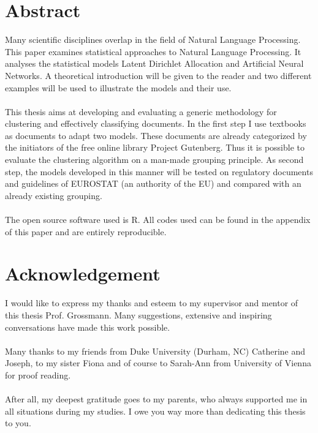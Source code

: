 \documentclass[11pt,a4paper]{article}
\author{Sebastian Knigge}
\begin{document}
\pagestyle{empty}	
	
	
\section*{Abstract}
Many scientific disciplines overlap in the field of Natural Language Processing. This paper examines statistical approaches to Natural Language Processing. It analyses the statistical models Latent Dirichlet Allocation and Artificial Neural Networks. A theoretical introduction will be given to the reader and two different examples will be used to illustrate the models and their use.\\
\ \\
This thesis aims at developing and evaluating a generic methodology for clustering and effectively classifying documents. In the first step I use textbooks as documents to adapt two models. These documents are already categorized by the initiators of the free online library Project Gutenberg. Thus it is possible to evaluate the clustering algorithm on a man-made grouping principle. As second step, the models developed in this manner will be tested on regulatory documents and guidelines of EUROSTAT (an authority of the EU) and compared with an already existing grouping.\\
\ \\
The open source software used is R. All codes used can be found in the appendix of this paper and are entirely reproducible.

	

\newpage

	
\section*{Acknowledgement}

I would like to express my thanks and esteem to my supervisor and mentor of this thesis Prof. Grossmann. Many suggestions, extensive and inspiring conversations have made this work possible.\\
\ \\
Many thanks to my friends from Duke University (Durham, NC) Catherine and Joseph, to my sister Fiona and of course to Sarah-Ann from University of Vienna for proof reading.\\
\ \\
After all, my deepest gratitude goes to my parents, who always supported me in all situations during my studies. I owe you way more than dedicating this thesis to you.
\end{document}
